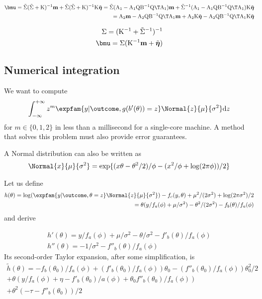 \begin{align*}
\bmu = \tilde{\Sigma} (\tilde{\Sigma} + \mathrm K)^{-1} \mathbf m + \tilde{\Sigma} (\tilde{\Sigma} +
\mathrm K)^{-1} \mathrm K \tilde{\boldsymbol\eta}
= \tilde{\Sigma} (\mathrm A_1 - \mathrm A_1 \mathrm Q \mathrm B^{-1}\mathrm Q\T \mathrm A_1) \mathbf m +
\tilde{\Sigma}^{-1} (\mathrm A_1 - \mathrm A_1 \mathrm Q \mathrm B^{-1}\mathrm Q\T \mathrm A_1)
          \mathrm K \tilde{\boldsymbol \eta}\\
= \mathrm A_2 \mathbf m - \mathrm A_2 \mathrm Q \mathrm B^{-1}\mathrm Q\T \mathrm A_1 \mathbf m
         + \mathrm A_2 \mathrm K \tilde{\boldsymbol \eta} - \mathrm A_2 \mathrm Q \mathrm B^{-1}\mathrm Q\T
           \mathrm A_1 \mathrm K \tilde{\boldsymbol \eta}
\end{align*}


\begin{align*}
\Sigma = (\mathrm K^{-1} + \tilde{\Sigma}^{-1})^{-1}\\
\bmu = \Sigma (\mathrm K^{-1} \mathbf m + \tilde{\boldsymbol\eta})
\end{align*}

\subsection{Numerical integration}

We want to compute
\begin{align*}
\int_{-\infty}^{+\infty} z^m \expfam{y |\outcome, g(b'(\theta))=z} \Normal{z}{\mu}{\sigma^2}\mathrm dz
\end{align*}
for $m\in\{0, 1, 2\}$ in less than a millisecond for a single-core machine. A method that solves this problem must also provide error guarantees.

A Normal distribution can also be written as
\begin{align*}
\Normal{x}{\mu}{\sigma^2} = \exp\{(x\theta - \theta^2/2)/\phi - (x^2/\phi + \log(2\pi\phi))/2\}
\end{align*}

Let us define
\begin{align*}
h(\theta)= \log(\expfam{y|\outcome, \theta=z} \Normal{z}{\mu}{\sigma^2}) - f_c(y, \theta) +
		\mu^2/(2\sigma^2) + \log(2\pi\sigma^2)/2\\
		=\theta(y/f_a(\phi) + \mu/\sigma^2) - \theta^2/(2\sigma^2) - f_b(\theta)/f_a(\phi)
\end{align*}
and derive


\begin{align*}
h'(\theta) = y/f_a(\phi) + \mu/\sigma^2 - \theta/\sigma^2 - f'_b(\theta)/f_a(\phi)\\
h''(\theta) = -1/\sigma^2 - f''_b(\theta)/f_a(\phi)
\end{align*}
Its second-order Taylor expansion, after some simplification, is
\begin{align*}
\tilde h(\theta) = -f_b(\theta_0)/f_a(\phi) + (f'_b(\theta_0)/f_a(\phi))\theta_0 - (f''_b(\theta_0)/f_a(\phi))\theta_0^2/2\\
	+\theta (y/f_a(\phi) + \eta - f'_b(\theta_0)/a(\phi) + \theta_0 f''_b(\theta_0)/f_a(\phi))\\
	+\theta^2(-\tau - f''_b(\theta_0))/2
\end{align*}
